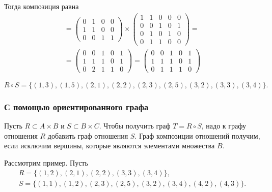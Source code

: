 \documentclass[a5paper, 11pt]{extarticle}
\theoremstyle{definition}
\theoremstyle{definition}
\theoremstyle{definition}
\numberwithin{figure}{section}
\numberwithin{table}{section}
\begin{document}
Тогда композиция равна
\begin{gather*}
    [R \circ S] =
    \begin{pmatrix}
        0 & 1 & 0 & 0 \\
        1 & 1 & 0 & 0 \\
        0 & 0 & 1 & 1
    \end{pmatrix}
    \times
    \begin{pmatrix}
        1 & 1 & 0 & 0 & 0 \\
        0 & 0 & 1 & 0 & 1 \\
        0 & 1 & 0 & 1 & 0 \\
        0 & 1 & 1 & 0 & 0
    \end{pmatrix}
    = \\ =
    \begin{pmatrix}
        0 & 0 & 1 & 0 & 1 \\
        1 & 1 & 1 & 0 & 1 \\
        0 & 2 & 1 & 1 & 0
    \end{pmatrix}
    =
    \begin{pmatrix}
        0 & 0 & 1 & 0 & 1 \\
        1 & 1 & 1 & 0 & 1 \\
        0 & 1 & 1 & 1 & 0
    \end{pmatrix}
\end{gather*}

\[
    R \circ S = \{(1, 3), (1, 5), (2, 1), (2, 2), (2, 3), (2, 5), (3, 2), (3, 3), (3, 4)\}.
\]

\subsubsection{С помощью ориентированного графа}

Пусть \(R \subset A \times B\) и \(S \subset B \times C\). Чтобы получить граф \(T = R \circ S\), надо к графу отношения \(R\) добавить граф отношения \(S\). Граф композиции отношений получим, если исключим вершины, которые являются элементами множества \(B\).

Рассмотрим пример. Пусть
\begin{gather*}
    R = \{(1, 2), (2, 1), (2, 2), (3, 3), (3, 4)\}, \\
    S = \{(1, 1), (1, 2), (2, 3), (2, 5), (3, 2), (3, 4), (4, 2), (4, 3)\}.
\end{gather*}
\end{document}
